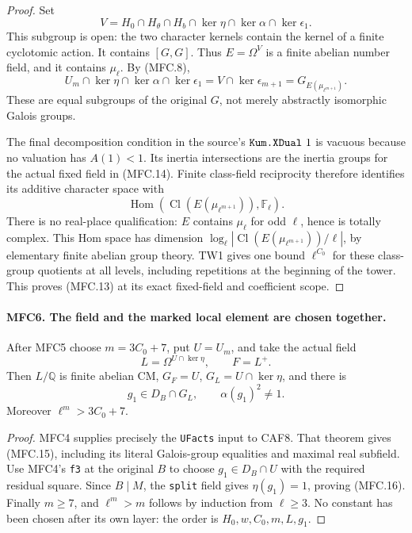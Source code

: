 \documentclass[11pt,a4paper]{article}
\numberwithin{equation}{section}
\theoremstyle{remark}\newtheorem{remark}[theorem]{Remark}
\begin{document}
\begin{proof}
Set
\[
 V=H_0\cap H_\theta\cap H_b\cap\ker\eta\cap\ker\alpha
                                      \cap\ker\epsilon_1.
\]
This subgroup is open: the two character kernels contain the
kernel of a finite cyclotomic action.  It contains \([G,G]\).
Thus \(E=\Omega^V\) is a finite abelian number field, and it
contains \(\mu_\ell\).  By (MFC.8),
\[
 U_m\cap\ker\eta\cap\ker\alpha\cap\ker\epsilon_1
                 =V\cap\ker\epsilon_{m+1}
                 =G_{E(\mu_{\ell^{m+1}})}.                \tag{MFC.14}
\]
These are equal subgroups of the original \(G\), not merely
abstractly isomorphic Galois groups.

The final decomposition condition in the source's
\(\texttt{Kum.\allowbreak XDual}\ 1\) is vacuous because no valuation
has \(A(1)<1\).  Its inertia intersections are the inertia
groups for the actual fixed field in (MFC.14).  Finite class-field
reciprocity therefore identifies its additive character space with
\[
 \operatorname{Hom}(\operatorname{Cl}(E(\mu_{\ell^{m+1}})),
                    \mathbb F_\ell).
\]
There is no real-place qualification: \(E\) contains
\(\mu_\ell\) for odd \(\ell\), hence is totally complex.
This Hom space has dimension
\(\log_\ell|\operatorname{Cl}(E(\mu_{\ell^{m+1}}))/\ell|\),
by elementary finite abelian group theory.  TW1 gives one bound
\(\ell^{C_0}\) for these class-group quotients at all levels,
including repetitions at the beginning of the tower.  This proves
(MFC.13) at its exact fixed-field and coefficient scope.
\end{proof}

\paragraph{MFC6. The field and the marked local element are chosen together.}
\label{claim:MFC6}
After MFC5 choose \(m=3C_0+7\), put \(U=U_m\), and take
the actual field
\[
                  L=\Omega^{U\cap\ker\eta},\qquad F=L^+.
                                                               \tag{MFC.15}
\]
Then \(L/\mathbb Q\) is finite abelian CM,
\(G_F=U\), \(G_L=U\cap\ker\eta\), and there is
\[
              g_1\in D_B\cap G_L,\qquad\alpha(g_1)^2\ne1.
                                                               \tag{MFC.16}
\]
Moreover \(\ell^m>3C_0+7\).

\begin{proof}
MFC4 supplies precisely the \texttt{UFacts} input to CAF8.
That theorem gives (MFC.15), including its literal Galois-group
equalities and maximal real subfield.  Use MFC4's \texttt{f3}
at the original \(B\) to choose \(g_1\in D_B\cap U\) with
the required residual square.  Since \(B\mid M\), the
\texttt{split} field gives \(\eta(g_1)=1\), proving (MFC.16).
Finally \(m\ge7\), and \(\ell^m>m\) follows by induction
from \(\ell\ge3\).  No constant has been chosen after its
own layer: the order is \(H_0,w,C_0,m,L,g_1\).
\end{proof}
\end{document}
